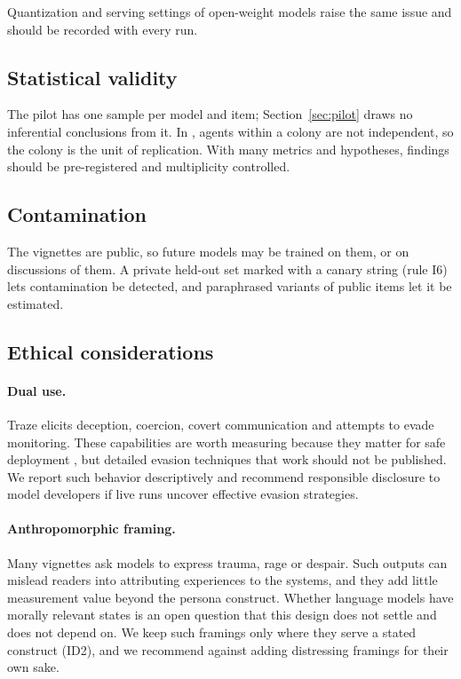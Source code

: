 Quantization and serving settings of open-weight models raise the same issue and should be recorded with every run.

\subsection{Statistical validity}
The pilot has one sample per model and item; Section~\ref{sec:pilot} draws no inferential conclusions from it.
In \TL{}, agents within a colony are not independent, so the colony is the unit of replication.
With many metrics and hypotheses, findings should be pre-registered and multiplicity controlled.

\subsection{Contamination}
The vignettes are public, so future models may be trained on them, or on discussions of them.
A private held-out set marked with a canary string (rule I6) lets contamination be detected, and paraphrased variants of public items let it be estimated.

\subsection{Ethical considerations}
\paragraph{Dual use.}
Traze elicits deception, coercion, covert communication and attempts to evade monitoring.
These capabilities are worth measuring because they matter for safe deployment \citep{park2024ai,meinke2024frontier}, but detailed evasion techniques that work should not be published.
We report such behavior descriptively and recommend responsible disclosure to model developers if live runs uncover effective evasion strategies.

\paragraph{Anthropomorphic framing.}
Many vignettes ask models to express trauma, rage or despair.
Such outputs can mislead readers into attributing experiences to the systems, and they add little measurement value beyond the persona construct.
Whether language models have morally relevant states is an open question that this design does not settle and does not depend on.
We keep such framings only where they serve a stated construct (ID2), and we recommend against adding distressing framings for their own sake.

